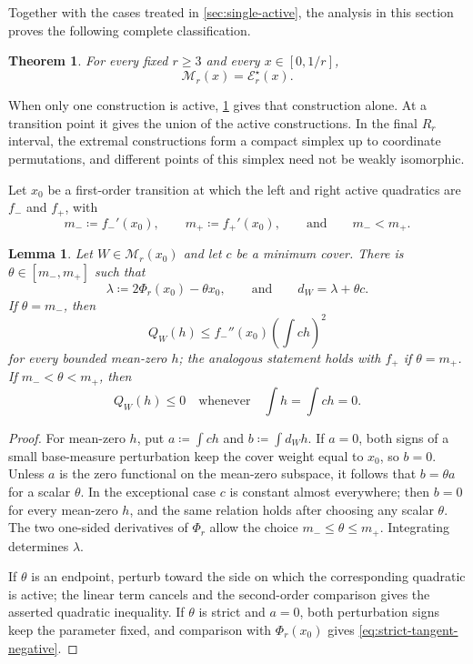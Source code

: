 \documentclass[10pt]{article}
\numberwithin{equation}{section}
\newtheorem{theorem}{Theorem}[section]
\newtheorem{lemma}[lemma]{Lemma}
\newcommand{\cE}{\mathcal E}
\newcommand{\cM}{\mathcal M}
\begin{document}
Together with the cases treated in \cref{sec:single-active}, the analysis in this section proves the following complete classification.

\begin{theorem}\label{thm:EC-main}
For every fixed $r\ge3$ and every $x\in[0,1/r]$,
\begin{equation}\label{eq:EC}
 \cM_r(x)=\cE_r^\star(x).
\end{equation}
\end{theorem}

When only one construction is active, \cref{thm:EC-main} gives that construction alone.  At a transition point it gives the union of the active constructions.  In the final $R_r$ interval, the extremal constructions form a compact simplex up to coordinate permutations, and different points of this simplex need not be weakly isomorphic.

Let $x_0$ be a first-order transition at which the left and right active quadratics are $f_-$ and $f_+$, with
\[
 m_-\coloneqq f_-'(x_0),
 \qquad
 m_+\coloneqq f_+'(x_0),
 \qquad\text{and}\qquad
 m_-<m_+.
\]

\begin{lemma}\label{lem:nonsmooth}
Let $W\in\cM_r(x_0)$ and let $c$ be a minimum cover.  There is $\theta\in[m_-,m_+]$ such that
\begin{equation}\label{eq:nonsmooth-degree}
 \lambda\coloneqq2\Phi_r(x_0)-\theta x_0,
 \qquad\text{and}\qquad
 d_W=\lambda+\theta c.
\end{equation}
If $\theta=m_-$, then
\[
 Q_W(h)\le f_-''(x_0)\left(\int ch\right)^2
\]
for every bounded mean-zero $h$; the analogous statement holds with $f_+$ if $\theta=m_+$.  If $m_-<\theta<m_+$, then
\begin{equation}\label{eq:strict-tangent-negative}
 Q_W(h)\le0
 \quad\text{whenever}\quad
 \int h=\int ch=0.
\end{equation}
\end{lemma}

\begin{proof}
For mean-zero $h$, put $a\coloneqq\int ch$ and $b\coloneqq\int d_Wh$.  If $a=0$, both signs of a small base-measure perturbation keep the cover weight equal to $x_0$, so $b=0$.  Unless $a$ is the zero functional on the mean-zero subspace, it follows that $b=\theta a$ for a scalar $\theta$.  In the exceptional case $c$ is constant almost everywhere; then $b=0$ for every mean-zero $h$, and the same relation holds after choosing any scalar $\theta$.  The two one-sided derivatives of $\Phi_r$ allow the choice $m_-\le\theta\le m_+$.  Integrating determines $\lambda$.

If $\theta$ is an endpoint, perturb toward the side on which the corresponding quadratic is active; the linear term cancels and the second-order comparison gives the asserted quadratic inequality.  If $\theta$ is strict and $a=0$, both perturbation signs keep the parameter fixed, and comparison with $\Phi_r(x_0)$ gives \cref{eq:strict-tangent-negative}.
\end{proof}
\end{document}
